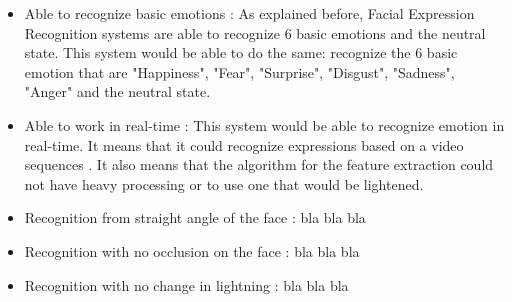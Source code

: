 \begin{itemize}
  \item Able to recognize basic emotions : 
  \noindent As explained before, Facial Expression Recognition systems are able to recognize 6 basic emotions and the neutral state. This system would be able to do the same: recognize the 6 basic emotion that are "Happiness", "Fear", "Surprise", "Disgust", "Sadness", "Anger" and the neutral state.
\newline

  \item Able to work in real-time : 
  \noindent This system would be able to recognize emotion in real-time. It means that it could recognize expressions based on a video sequences . It also means that the algorithm for the feature extraction could not have heavy processing or to use one that would be lightened. 
\newline

  \item Recognition from straight angle of the face : 
  \noindent bla bla bla
\newline

  \item Recognition with no occlusion on the face : 
  \noindent bla bla bla
\newline

  \item Recognition with no change in lightning : 
  \noindent bla bla bla
\newline
\end{itemize}

